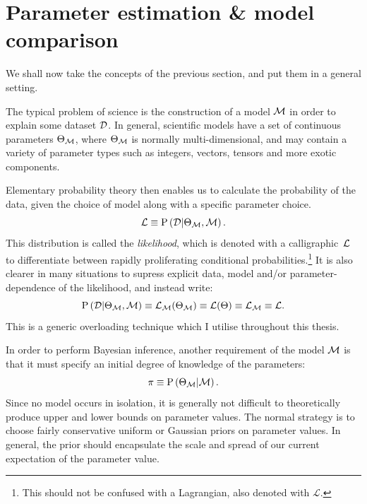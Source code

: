\section{Parameter estimation \& model comparison}
\label{sec:bay:model_comp}
We shall now take the concepts of the previous section, and put them in a general setting. 

The typical problem of science is the construction of a model $\mathcal{M}$ in order to explain some dataset $\mathcal{D}$. In general, scientific models have a set of continuous parameters $\Theta_{\mathcal{M}}$, where $\Theta_{\mathcal{M}}$ is normally multi-dimensional, and may contain a variety of parameter types such as integers, vectors, tensors and more exotic components.

Elementary probability theory then enables us to calculate the probability of the data, given the choice of model along with a specific parameter choice.
\begin{equation}
  \mathcal{L}\equiv\mathrm{P}\left(\mathcal{D}\middle|\Theta_{\mathcal{M}},\mathcal{M}\right).
  \label{eqn:bay:lik_def}
\end{equation}
This distribution is called the {\em likelihood}, which is denoted with a calligraphic~$\mathcal{L}$ to differentiate between rapidly proliferating conditional probabilities.\footnote{This should not be confused with a Lagrangian, also denoted with $\mathcal{L}$.} It is also clearer in many situations to supress explicit data, model and/or parameter-dependence of the likelihood, and instead write:
\begin{equation}
  \mathrm{P}\left(\mathcal{D}\middle|\Theta_{\mathcal{M}},\mathcal{M}\right)
  \equiv
  \mathcal{L}_{\mathcal{M}}(\Theta_{\mathcal{M}})
  \equiv
  \mathcal{L}(\Theta)
  \equiv
  \mathcal{L}_{\mathcal{M}}
  \equiv
  \mathcal{L}.\nonumber
\end{equation}
This is a generic overloading technique which I utilise throughout this thesis.

In order to perform Bayesian inference, another requirement of the model $\mathcal{M}$ is that it must specify an initial degree of knowledge of the parameters:
\begin{equation}
  \pi\equiv\mathrm{P}\left(\Theta_{\mathcal{M}}\middle|\mathcal{M}\right).
  \label{eqn:bay:prior_def}
\end{equation}
Since no model occurs in isolation, it is generally not difficult to theoretically produce upper and lower bounds on parameter values. The normal strategy is to choose fairly conservative uniform or Gaussian priors on parameter values. In general, the prior should encapsulate the scale and spread of our current expectation of the parameter value.

